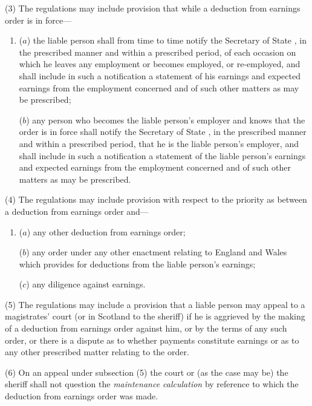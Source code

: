 \documentclass[12pt,a4paper]{article}
\begin{document}
(3) The regulations may include provision that while a deduction from earnings order is in force—
\begin{enumerate}\item[]
($a$) the liable person shall from time to time notify the 
Secretary of State%
, in the prescribed manner and within a prescribed period, of each occasion on which he leaves any employment or becomes employed, or re-employed, and shall include in such a notification a statement of his earnings and expected earnings from the employment concerned and of such other matters as may be prescribed;

($b$) any person who becomes the liable person’s employer and knows that the order is in force shall notify the 
Secretary of State%
, in the prescribed manner and within a prescribed period, that he is the liable person’s employer, and shall include in such a notification a statement of the liable person’s earnings and expected earnings from the employment concerned and of such other matters as may be prescribed.
\end{enumerate}

(4) The regulations may include provision with respect to the priority as between a deduction from earnings order and—
\begin{enumerate}\item[]
($a$) any other deduction from earnings order;

($b$) any order under any other enactment relating to England and Wales which provides for deductions from the liable person’s earnings;

($c$) any diligence against earnings.
\end{enumerate}

(5) The regulations may include a provision that a liable person may appeal to a magistrates' court (or in Scotland to the sheriff) if he is aggrieved by the making of a deduction from earnings order against him, or by the terms of any such order, or there is a dispute as to whether payments constitute earnings or as to any other prescribed matter relating to the order.

(6) On an appeal under subsection (5)  the court or (as the case may be) the sheriff shall not question the 
\emph{maintenance calculation}  %
by reference to which the deduction from earnings order was made.
\end{document}
